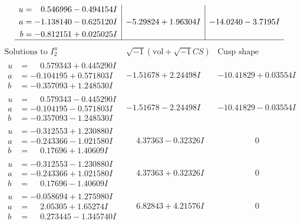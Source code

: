\documentclass[1p]{elsarticle_modified}
\theoremstyle{definition}
\newcommand{\I}{\sqrt{-1}}
\begin{document}
$$\begin{array}{c|c|c}
\begin{aligned}
u &= \phantom{-}0.546996 - 0.494154 I \\
a &= -1.138140 - 0.625120 I \\
b &= -0.812151 + 0.025025 I\end{aligned}
 & -5.29824 + 1.96304 I & -14.0240 - 3.7195 I\\
 \hline 
 \end{array}$$\newpage$$\begin{array}{c|c|c}  
\text{Solutions to }I^u_{2}& \I (\text{vol} + \sqrt{-1}CS) & \text{Cusp shape}\\
 \hline 
\begin{aligned}
u &= \phantom{-}0.579343 + 0.445290 I \\
a &= -0.104195 + 0.571803 I \\
b &= -0.357093 + 1.248530 I\end{aligned}
 & -1.51678 + 2.24498 I & -10.41829 + 0.03554 I \\ \hline\begin{aligned}
u &= \phantom{-}0.579343 - 0.445290 I \\
a &= -0.104195 - 0.571803 I \\
b &= -0.357093 - 1.248530 I\end{aligned}
 & -1.51678 - 2.24498 I & -10.41829 - 0.03554 I \\ \hline\begin{aligned}
u &= -0.312553 + 1.230880 I \\
a &= -0.243366 - 1.021580 I \\
b &= \phantom{-}0.17696 + 1.40609 I\end{aligned}
 & \phantom{-}4.37363 - 0.32326 I & \phantom{-0.000000 } 0 \\ \hline\begin{aligned}
u &= -0.312553 - 1.230880 I \\
a &= -0.243366 + 1.021580 I \\
b &= \phantom{-}0.17696 - 1.40609 I\end{aligned}
 & \phantom{-}4.37363 + 0.32326 I & \phantom{-0.000000 } 0 \\ \hline\begin{aligned}
u &= -0.058694 + 1.275980 I \\
a &= \phantom{-}2.05305 + 1.65274 I \\
b &= \phantom{-}0.273445 - 1.345740 I\end{aligned}
 & \phantom{-}6.82843 + 4.21576 I & \phantom{-0.000000 } 0 \\ \hline\begin{aligned}

\end{aligned}
\end{array}$$
\end{document}
